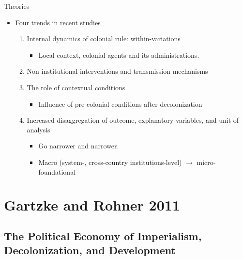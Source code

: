 \documentclass[xcolor=dvipsnames]{beamer}
\begin{document}
	\begin{frame}[fragile]{Theories}
		\begin{itemize}
			\item Four trends in recent studies
			\begin{enumerate}
				\item Internal dynamics of colonial rule: within-variations \pause
				\begin{itemize}
					\item Local context, colonial agents and its administrations. \pause
				\end{itemize}
				\item Non-institutional interventions and transmission mechanisms \pause
				\item The role of contextual conditions \pause
				\begin{itemize}
					\item Influence of pre-colonial conditions after decolonization \pause
				\end{itemize}
				\item Increased disaggregation of outcome, explanatory variables, and unit of analysis \pause
				\begin{itemize}
					\item Go narrower and narrower.
					\item Macro (system-, cross-country institutions-level) $\rightarrow$ micro-foundational
				\end{itemize}
			\end{enumerate}
		\end{itemize}
	\end{frame}
	
	
	\section{Gartzke and Rohner 2011}
	\subsection{The Political Economy of Imperialism, Decolonization, and Development}
	
\end{document}
